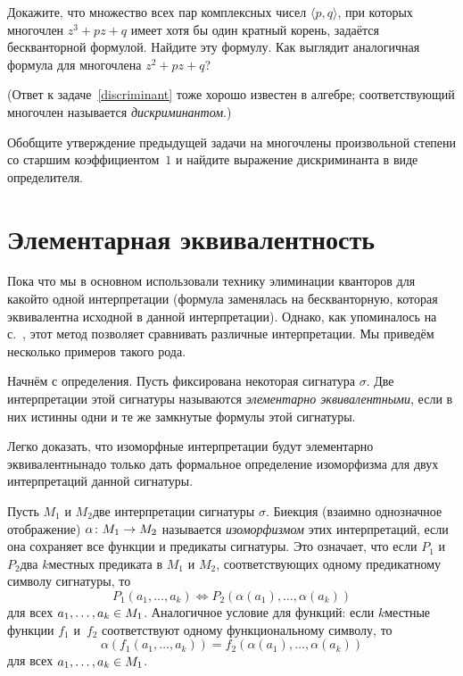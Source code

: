 \begin{problem}
        \label{discriminant}%
Докажите, что множество всех пар комплексных чисел $\langle
p,q\rangle$, при которых многочлен $z^3+pz+q$ имеет хотя бы один
кратный корень, задаётся бескванторной формулой. Найдите эту
формулу. Как выглядит аналогичная формула для многочлена
$z^2+pz+q$?
\end{problem}
(Ответ к задаче~\ref{discriminant} тоже хорошо известен в алгебре;
соответствующий многочлен называется \emph{дискриминантом}.)%

\begin{problem}
Обобщите утверждение предыдущей задачи на многочлены
произвольной степени со старшим коэффициентом~$1$ и найдите
выражение дискриминанта в виде определителя.
\end{problem}

\section{Элементарная эквивалентность}
%
        \label{elementary-equivalence}%
Пока что мы в основном
использовали технику элиминации кванторов для
какой\д то одной интерпретации (формула заменялась на
бескванторную, которая эквивалентна исходной в данной
интерпретации). Однако, как упоминалось на
с.~\pageref{dense-sets-elementary-equivalence}, этот метод
позволяет сравнивать различные интерпретации. Мы приведём
несколько примеров такого рода.

Начнём с определения. Пусть фиксирована некоторая сигнатура
$\sigma$. Две интерпретации этой сигнатуры называются
\emph{элементарно эквивалентными},%
если в них истинны одни и те
же замкнутые формулы этой сигнатуры.

Легко доказать, что изоморфные интерпретации
будут элементарно
эквивалентны\т надо только дать формальное определение изоморфизма
для двух интерпретаций данной сигнатуры.

Пусть $M_1$ и $M_2$\т две интерпретации сигнатуры $\sigma$.
Биекция (взаимно однозначное отображение) $\alpha\colon M_1\hm\to M_2$
называется \emph{изоморфизмом}%
%
этих интерпретаций, если она
сохраняет все функции и предикаты сигнатуры. Это означает,
что если $P_1$ и $P_2$\т два $k$\д местных предиката в $M_1$
и $M_2$, соответствующих одному предикатному символу
сигнатуры, то
        $$
P_1(a_1,\dots,a_k) \Leftrightarrow P_2(\alpha(a_1),\dots,\alpha(a_k))
        $$
для всех $a_1,\dots,a_k\hm\in M_1$. Аналогичное условие
для функций: если $k$\д местные функции
$f_1$ и~$f_2$ соответствуют одному функциональному символу,
то
        $$
\alpha(f_1(a_1,\dots,a_k))=f_2(\alpha(a_1),\dots,\alpha(a_k))
        $$
для всех $a_1,\dots,a_k\hm\in M_1$.

